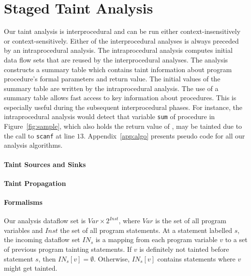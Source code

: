 \section{Staged Taint Analysis}\label{sec:analysis}

\newcommand{\varset}{\mathit{Var}}
\newcommand{\instset}{\mathit{Inst}}
\newcommand{\procset}{\mathit{Proc}}
\newcommand{\formalsset}{\mathit{formals}}
\newcommand{\firstfunc}{\mathit{first}}
\newcommand{\toplevelfunc}{\mathit{toplevel}}
\newcommand{\pointsto}[2]{{pt}_{[#1]}(#2)}
\newcommand{\pointstobefore}[2]{{pt}_{[\overline{#1}]	}(#2)}
\newcommand{\pointstoafter}[2]{{pt}_{[\underline{#1}]}(#2)}

\newcommand{\myinflow}{\mathit{IN}}
\newcommand{\myoutflow}{\mathit{OUT}}
\newcommand{\ifff}{\mathit{iff}}
\newcommand{\aand}{\mathit{and}}
\newcommand{\mybigcup}[2]{\mathlarger{\bigcup_{#1}^{#2}}}

Our taint analysis is interprocedural and can be run
either context-insensitively or context-sensitively.
Either of the interprocedural analyses is always preceded
by an intraprocedural analysis. The intraprocedural analysis
computes initial data flow sets that are reused by the
interprocedural analyses.
The analysis constructs a summary table which contains
taint information about program procedure's formal
parameters and return value.
The initial values of the summary table are written by
the intraprocedural analysis. The use of a summary table
allows fast access to key information about procedures.
This is especially useful during the subsequent interprocedural
phases.
For instance, the intraprocedural analysis would
detect that variable \texttt{sum} of procedure \compute{} in
Figure~\ref{fig:sample}, which also holds the return
value of \compute{}, may be tainted due to the call
to \texttt{scanf} at line $13$.
Appendix~\ref{app:algo} presents pseudo code for all
our analysis algorithms.

\paragraph{Taint Sources and Sinks}

\paragraph{Taint Propagation}

\paragraph{Formalisms}
Our analysis dataflow set is $\varset \times 2^\instset$,
where $\varset$ is the set of all program variables and
$\instset$ the set of all program statements. 
At a statement labelled $s$, the incoming dataflow set $\myinflow_s$
is a mapping from each program variable $v$ to a set of
previous program tainting statements.
If $v$ is definitely not tainted before statement $s$, then
$\myinflow_s[v] = \emptyset$. Otherwise, $\myinflow_s[v]$
contains statements where $v$ might get tainted.

